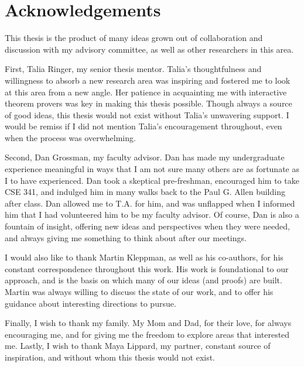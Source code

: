 \chapter{Acknowledgements}

This thesis is the product of many ideas grown out of collaboration and
discussion with my advisory committee, as well as other researchers in this
area.

First, Talia Ringer, my senior thesis mentor. Talia's thoughtfulness and
willingness to absorb a new research area was inspiring and fostered me to
look at this area from a new angle. Her patience in acquainting me with
interactive theorem provers was key in making this thesis possible. Though
always a source of good ideas, this thesis would not exist without Talia's
unwavering support. I would be remiss if I did not mention Talia's encouragement
throughout, even when the process was overwhelming.

Second, Dan Grossman, my faculty advisor. Dan has made my undergraduate
experience meaningful in ways that I am not sure many others are as fortunate as
I to have experienced. Dan took a skeptical pre-freshman, encouraged him to take
CSE 341, and indulged him in many walks back to the Paul G. Allen building after
class. Dan allowed me to T.A. for him, and was unflapped when I informed him
that I had volunteered him to be my faculty advisor. Of course, Dan is also a
fountain of insight, offering new ideas and perspectives when they were needed,
and always giving me something to think about after our meetings.

I would also like to thank Martin Kleppman, as well as his co-authors, for his
constant correspondence throughout this work. His work is foundational to our
approach, and is the basis on which many of our ideas (and proofs) are built.
Martin was always willing to discuss the state of our work, and to offer his
guidance about interesting directions to pursue.

Finally, I wish to thank my family. My Mom and Dad, for their love, for always
encouraging me, and for giving me the freedom to explore areas that interested
me. Lastly, I wish to thank Maya Lippard, my partner, constant source of
inspiration, and without whom this thesis would not exist.
